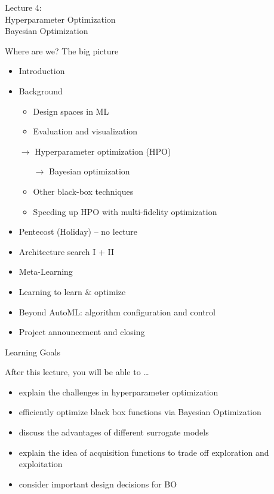 \begin{frame}[c]{}

\centering
\huge
Lecture 4:\\
Hyperparameter Optimization\\
Bayesian Optimization
\end{frame}
\begin{frame}[c]{Where are we? The big picture}

\begin{itemize}
	\item Introduction
	\item Background
	\begin{itemize}
		\item Design spaces in ML
		\item Evaluation and visualization
	\end{itemize}
	\item[$\to$] Hyperparameter optimization (HPO)
	\begin{itemize}
		\item[$\to$] Bayesian optimization
		\item Other black-box techniques
		\item Speeding up HPO with multi-fidelity optimization
	\end{itemize}
	\item Pentecost (Holiday) -- no lecture
	\item Architecture search I + II
	\item Meta-Learning
	\item Learning to learn $\&$ optimize
	\item Beyond AutoML: algorithm configuration and control
	\item Project announcement and closing
\end{itemize}

\end{frame}

\begin{frame}[c]{Learning Goals}

After this lecture, you will be able to \ldots

\begin{itemize}
	\item explain the \alert{challenges in hyperparameter optimization}
	\item efficiently optimize black box functions via \alert{Bayesian Optimization}
	\item discuss the advantages of different \alert{surrogate models}
	\item explain the idea of \alert{acquisition functions} to trade off exploration and exploitation
	\item consider important \alert{design decisions} for BO
\end{itemize}


\end{frame}
